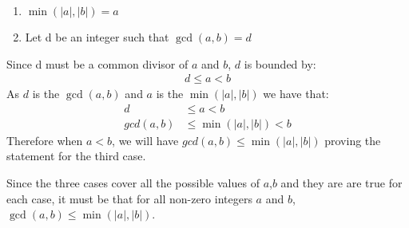 \documentclass[11pt]{article}
\begin{document}
\begin{enumerate}
\item $\min(|a|, |b|) = a$

\item Let d be an integer such that $\gcd(a, b) = d$
\end{enumerate}

Since d must be a common divisor of $a$ and $ b$, $d$ is bounded by:
\begin{align*}
d \leq a < b
\end{align*}
As $d$ is the $\gcd(a,b)$ and $a$ is the $\min(|a|,|b|)$ we have that:
\begin{align*}
d &\leq a < b \\
gcd(a,b) &\leq \min(|a|,|b|) < b
\end{align*}
Therefore when $ a < b$, we will have $gcd(a,b) \leq \min(|a|,|b|)$ proving the statement for the third case.

Since the three cases cover all the possible values of $a$,$b$ and they are are true for each case, it must be that for all non-zero integers $a$ and $b$, $\gcd(a, b) \leq \min(|a|, |b|)$.\\
\end{document}
